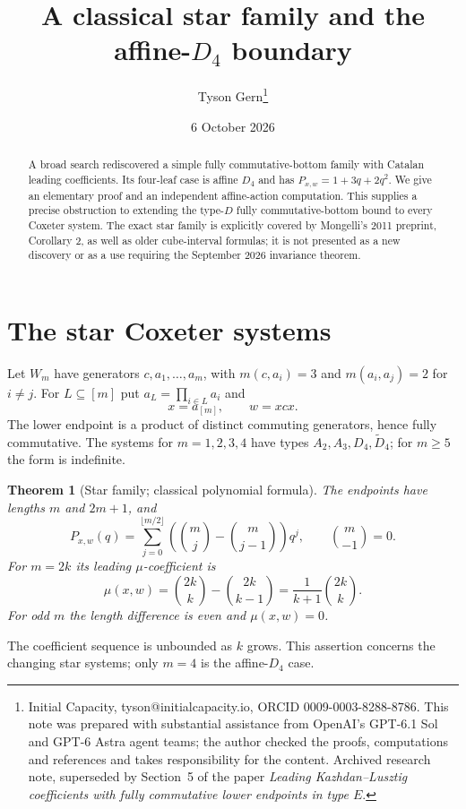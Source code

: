 \documentclass[11pt]{article}
\title{A classical star family and the affine-$D_4$ boundary}
\author{Tyson Gern\thanks{Initial Capacity, tyson@initialcapacity.io, ORCID 0009-0003-8288-8786. This note was prepared with substantial assistance from OpenAI's GPT-6.1 Sol and GPT-6 Astra agent teams; the author checked the proofs, computations and references and takes responsibility for the content. Archived research note, superseded by Section~5 of the paper \emph{Leading Kazhdan--Lusztig coefficients with fully commutative lower endpoints in type $E$}.}}
\date{6 October 2026}
\newtheorem{theorem}{Theorem}
\begin{document}
\maketitle
\begin{abstract}
A broad search rediscovered a simple fully commutative-bottom family with
Catalan leading coefficients. Its four-leaf case is affine $D_4$ and has
$P_{x,w}=1+3q+2q^2$. We give an elementary proof and an independent
affine-action computation. This supplies a precise obstruction to extending
the type-$D$ fully commutative-bottom bound to every Coxeter system. The
exact star family is explicitly covered by Mongelli's 2011 preprint,
Corollary 2, as well as older cube-interval formulas; it is not presented
as a new discovery or as a use requiring the
September 2026 invariance theorem.
\end{abstract}

\section{The star Coxeter systems}
Let $W_m$ have generators $c,a_1,\ldots,a_m$, with
$m(c,a_i)=3$ and $m(a_i,a_j)=2$ for $i\ne j$.
For $L\subseteq[m]$ put $a_L=\prod_{i\in L}a_i$ and
\[
 x=a_{[m]},\qquad w=xcx.
\]
The lower endpoint is a product of distinct commuting generators, hence
fully commutative. The systems for $m=1,2,3,4$ have types
$A_2,A_3,D_4,\widetilde D_4$; for $m\geq5$ the form is indefinite.

\begin{theorem}[Star family; classical polynomial formula]\label{thm:star}
The endpoints have lengths $m$ and $2m+1$, and
\[
 P_{x,w}(q)=\sum_{j=0}^{\lfloor m/2\rfloor}
 \left(\binom mj-\binom m{j-1}\right)q^j,
 \qquad \binom m{-1}=0.
\]
For $m=2k$ its leading $\mu$-coefficient is
\[
 \mu(x,w)=\binom{2k}{k}-\binom{2k}{k-1}
 =\frac{1}{k+1}\binom{2k}{k}.
\]
For odd $m$ the length difference is even and $\mu(x,w)=0$.
\end{theorem}
The coefficient sequence is unbounded as $k$ grows. This assertion concerns
the changing star systems; only $m=4$ is the affine-$D_4$ case.
\end{document}
